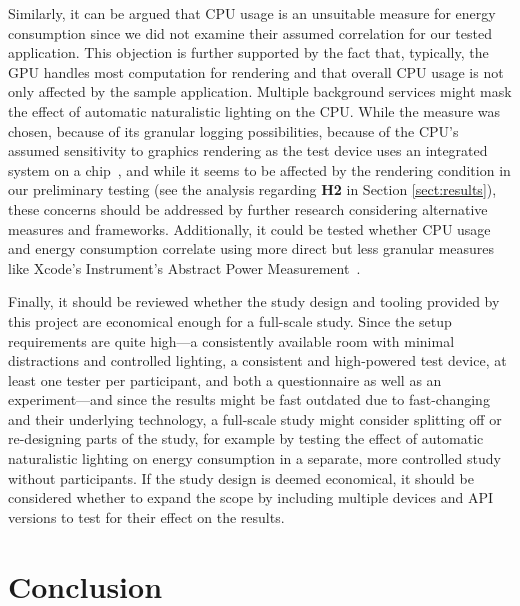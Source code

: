 \documentclass[12pt,twoside,english]{article}
\begin{document}
Similarly, it can be argued that \gls{CPU} usage is an unsuitable measure for energy consumption since we did not examine their assumed correlation for our tested application.
This objection is further supported by the fact that, typically, the \gls{GPU} handles most computation for rendering and that overall \gls{CPU} usage is not only affected by the sample application.
Multiple background services might mask the effect of automatic naturalistic lighting on the \gls{CPU}.
While the measure was chosen, because of its granular logging possibilities, because of the \gls{CPU}'s assumed sensitivity to graphics rendering as the test device uses an integrated system on a chip~\cite{apple_apple_2017}, and while it seems to be affected by the rendering condition in our preliminary testing (see the analysis regarding \textbf{H2} in Section \ref{sect:results}), these concerns should be addressed by further research considering alternative measures and frameworks.
Additionally, it could be tested whether \gls{CPU} usage and energy consumption correlate using more direct but less granular measures like Xcode's Instrument's Abstract Power Measurement~\cite{apple_abstract_2020}.

Finally, it should be reviewed whether the study design and tooling provided by this project are economical enough for a full-scale study.
Since the setup requirements are quite high---a consistently available room with minimal distractions and controlled lighting, a consistent and high-powered test device, at least one tester per participant, and both a questionnaire as well as an experiment---and since the results might be fast outdated due to fast-changing  and their underlying technology, a full-scale study might consider splitting off or re-designing parts of the study, for example by testing the effect of automatic naturalistic lighting on energy consumption in a separate, more controlled study without participants.
If the study design is deemed economical, it should be considered whether to expand the scope by including multiple devices and API versions to test for their effect on the results.

\section{Conclusion}
\label{sect:conclusion}
\end{document}
